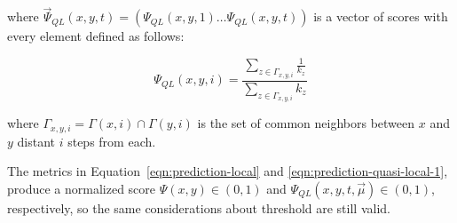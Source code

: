 where $\vec{\Psi}_{QL}(x,y,t)=(\Psi_{QL}(x,y,1)\ldots\Psi_{QL}(x,y,t))$ is a vector of scores with every element defined as follows:

\begin{equation}
\label{eqn:prediction-quasi-local-2}
\Psi_{QL}(x,y,i)=
\frac{\sum\limits_{z\in \Gamma_{x,y,i}}\frac{1}{k_{z}}}
{\sum\limits_{z\in\Gamma_{x,y,i}}k_{z}}
\end{equation}

where $\Gamma_{x,y,i} = \Gamma(x,i) \cap \Gamma(y,i)$ is the set of common neighbors between $x$ and $y$ distant $i$ steps from each.

The metrics in Equation~\ref{eqn:prediction-local} and  \ref{eqn:prediction-quasi-local-1}, produce a normalized score $\Psi(x,y) \in (0,1)$ and $\Psi_{QL}(x,y,t,\vec{\mu}) \in (0,1)$, respectively, so the same considerations about  threshold are still valid. 